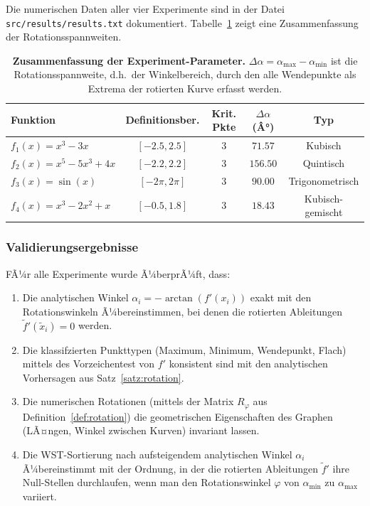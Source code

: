 ﻿\documentclass[12pt, a4paper]{article}
\theoremstyle{definition}
\begin{document}
	Die numerischen Daten aller vier Experimente sind in der Datei \texttt{src/results/results.txt}
	dokumentiert. Tabelle~\ref{tab:summary_stats} zeigt eine Zusammenfassung der Rotationsspannweiten.
	
	\begin{table}[H]
		\centering
		\begin{tabular}{|l|c|c|c|c|}
			\hline
			\textbf{Funktion} & \textbf{Definitionsber.} & \textbf{Krit. Pkte} & \textbf{$\Delta \alpha$ (Â°)} & \textbf{Typ} \\
			\hline
			$f_1(x) = x^3 - 3x$ & $[-2.5, 2.5]$ & 3 & $71.57$ & Kubisch \\
			$f_2(x) = x^5 - 5x^3 + 4x$ & $[-2.2, 2.2]$ & 3 & $156.50$ & Quintisch \\
			$f_3(x) = \sin(x)$ & $[-2\pi, 2\pi]$ & 3 & $90.00$ & Trigonometrisch \\
			$f_4(x) = x^3 - 2x^2 + x$ & $[-0.5, 1.8]$ & 3 & $18.43$ & Kubisch-gemischt \\
			\hline
		\end{tabular}
		\caption{
			\textbf{Zusammenfassung der Experiment-Parameter.}
			$\Delta \alpha = \alpha_\mathrm{max} - \alpha_\mathrm{min}$ ist die Rotationsspannweite,
			d.h.\ der Winkelbereich, durch den alle Wendepunkte als Extrema der rotierten Kurve erfasst werden.
		}
		\label{tab:summary_stats}
	\end{table}
	
	\subsubsection{Validierungsergebnisse}
	
	FÃ¼r alle Experimente wurde Ã¼berprÃ¼ft, dass:
	
	\begin{enumerate}[label=\textbf{\arabic*.}]
		\item Die analytischen Winkel $\alpha_i = -\arctan(f'(x_i))$ exakt mit den
		Rotationswinkeln Ã¼bereinstimmen, bei denen die rotierten Ableitungen $\tilde{f}'(\tilde{x}_i) = 0$ werden.
		
		\item Die klassifzierten Punkttypen (Maximum, Minimum, Wendepunkt, Flach)
		mittels des Vorzeichentest von $f'$ konsistent sind mit den analytischen Vorhersagen
		aus Satz~\ref{satz:rotation}.
		
		\item Die numerischen Rotationen (mittels der Matrix $R_\varphi$ aus Definition~\ref{def:rotation})
		die geometrischen Eigenschaften des Graphen (LÃ¤ngen, Winkel zwischen Kurven) invariant lassen.
		
		\item Die WST-Sortierung nach aufsteigendem analytischen Winkel $\alpha_i$ Ã¼bereinstimmt mit
		der Ordnung, in der die rotierten Ableitungen $\tilde{f}'$ ihre Null-Stellen durchlaufen,
		wenn man den Rotationswinkel $\varphi$ von $\alpha_\mathrm{min}$ zu $\alpha_\mathrm{max}$ variiert.
	\end{enumerate}
	
\end{document}
